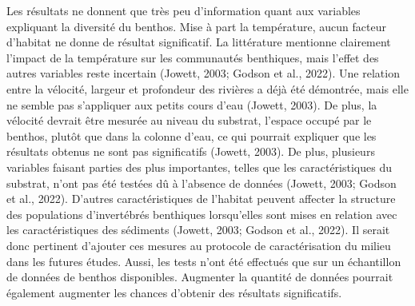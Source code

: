 \documentclass[9pt,twocolumn,twoside,]{pnas-new}
\begin{document}
Les résultats ne donnent que très peu d'information quant aux variables
expliquant la diversité du benthos. Mise à part la température, aucun
facteur d'habitat ne donne de résultat significatif. La littérature
mentionne clairement l'impact de la température sur les communautés
benthiques, mais l'effet des autres variables reste incertain (Jowett,
2003; Godson et al., 2022). Une relation entre la vélocité, largeur et
profondeur des rivières a déjà été démontrée, mais elle ne semble pas
s'appliquer aux petits cours d'eau (Jowett, 2003). De plus, la vélocité
devrait être mesurée au niveau du substrat, l'espace occupé par le
benthos, plutôt que dans la colonne d'eau, ce qui pourrait expliquer que
les résultats obtenus ne sont pas significatifs (Jowett, 2003). De plus,
plusieurs variables faisant parties des plus importantes, telles que les
caractéristiques du substrat, n'ont pas été testées dû à l'absence de
données (Jowett, 2003; Godson et al., 2022). D'autres caractéristiques
de l'habitat peuvent affecter la structure des populations d'invertébrés
benthiques lorsqu'elles sont mises en relation avec les caractéristiques
des sédiments (Jowett, 2003; Godson et al., 2022). Il serait donc
pertinent d'ajouter ces mesures au protocole de caractérisation du
milieu dans les futures études. Aussi, les tests n'ont été effectués que
sur un échantillon de données de benthos disponibles. Augmenter la
quantité de données pourrait également augmenter les chances d'obtenir
des résultats significatifs.

\showmatmethods
\showacknow
\pnasbreak



% 
\end{document}
